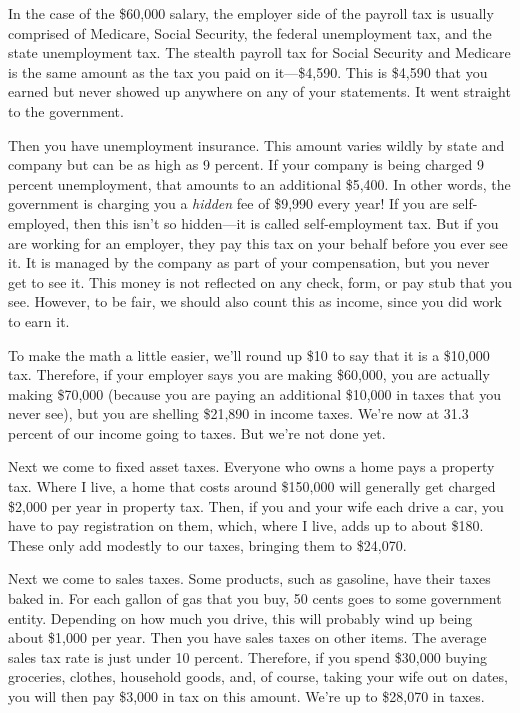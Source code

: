 In the case of the \$60,000 salary, the employer side of the payroll tax
is usually comprised of Medicare, Social Security, the federal
unemployment tax, and the state unemployment tax. The stealth payroll tax for
Social Security and Medicare is the same amount as the tax you paid on
it---\$4,590. This is \$4,590 that you earned but never showed up
anywhere on any of your statements. It went straight to the government.

Then you have unemployment insurance. This amount varies wildly by
state and company but can be as high as 9 percent. If your company is
being charged 9 percent unemployment, that amounts to an additional
\$5,400. In other words, the government is charging you a
\textit{hidden} fee of \$9,990 every year!  If you are self-employed,
then this isn't so hidden---it is called
self-employment tax.  But if you are working for an employer, they pay
this tax on your behalf before you ever see it.  It is managed by the company as part
of your compensation, but you never get to see it.  This 
money is not reflected on any check, form, or pay stub that you
see. However, to be fair, we should also count this as income, since you did work to earn it.

To make the math a little easier, we’ll round up \$10 to say that it is
a \$10,000 tax. Therefore, if your employer says you are making
\$60,000, you are actually making \$70,000 (because you are paying an additional
\$10,000 in taxes that you never see), but you are shelling \$21,890
in income taxes. We’re now at 31.3 percent of our income going to taxes. But
we’re not done yet.

Next we come to fixed asset taxes. Everyone who owns a home pays a
property tax. Where I live, a  home that costs around \$150,000 will generally get
charged \$2,000 per year in property tax. Then, if you and your wife
each drive a car, you have to pay registration on them, which, where I
live, adds up to about \$180. These only add modestly to our taxes,
bringing them to \$24,070.

Next we come to sales taxes. Some products, such as gasoline, have their
taxes baked in. For each gallon of gas that you buy, 50 cents goes to
some government entity. Depending on how much you drive, this will probably 
wind up being about \$1,000 per year. Then you have sales taxes on
other items. The average sales tax rate is just under 10 percent.
Therefore, if you spend \$30,000 buying groceries, clothes, household goods, and, of
course, taking your wife out on dates, you will then
pay \$3,000 in tax on this amount.  We’re up to \$28,070 in taxes. 

